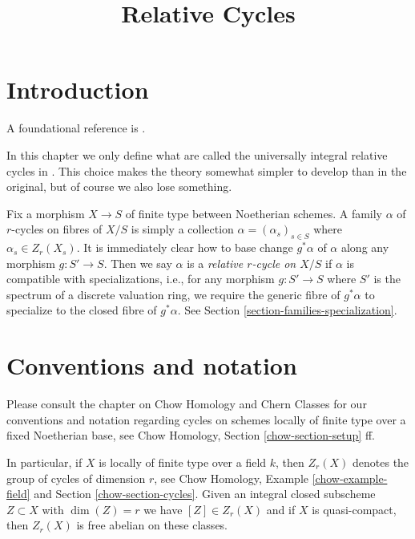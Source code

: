 \documentclass{stacks-project}
\theoremstyle{plain}
\theoremstyle{definition}
\theoremstyle{remark}
\numberwithin{equation}{subsection}
\begin{document}
\title{Relative Cycles}


\maketitle

\label{section-phantom}

\tableofcontents



\section{Introduction}
\label{section-introduction}

\noindent
A foundational reference is \cite{SV}.

\medskip\noindent
In this chapter we only define what are called the universally integral
relative cycles in \cite{SV}. This choice makes the theory somewhat
simpler to develop than in the original, but of course we also lose something.

\medskip\noindent
Fix a morphism $X \to S$ of finite type 
between Noetherian schemes. A family $\alpha$ of $r$-cycles on fibres
of $X/S$ is simply a collection $\alpha = (\alpha_s)_{s \in S}$
where $\alpha_s \in Z_r(X_s)$. It is immediately clear how to
base change $g^*\alpha$ of $\alpha$ along any morphism $g : S' \to S$.
Then we say $\alpha$ is a {\it relative $r$-cycle on $X/S$}
if $\alpha$ is compatible with specializations, i.e., for any
morphism $g : S' \to S$ where $S'$ is the spectrum of a discrete
valuation ring, we require the generic fibre of $g^*\alpha$
to specialize to the closed fibre of $g^*\alpha$.
See Section \ref{section-families-specialization}.






\section{Conventions and notation}
\label{section-conventions}

\noindent
Please consult the chapter on Chow Homology and Chern Classes
for our conventions and notation regarding cycles on schemes
locally of finite type over a fixed Noetherian base, see
Chow Homology, Section \ref{chow-section-setup} ff.

\medskip\noindent
In particular, if $X$ is locally of finite type over a field $k$,
then $Z_r(X)$ denotes the group of cycles of dimension $r$, see
Chow Homology, Example \ref{chow-example-field} and
Section \ref{chow-section-cycles}. Given an integral closed
subscheme $Z \subset X$ with $\dim(Z) = r$ we have $[Z] \in Z_r(X)$
and if $X$ is quasi-compact, then $Z_r(X)$ is free abelian on these classes.
\end{document}
